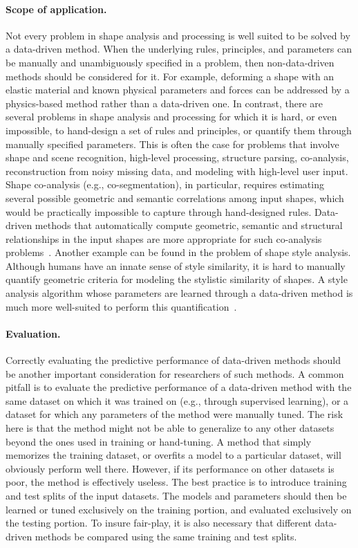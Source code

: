 \paragraph*{Scope of application.}
Not every problem in shape analysis and processing is well suited to be solved by a data-driven method. When the underlying rules, principles, and parameters can be manually and unambiguously specified in a problem, then non-data-driven  methods should be considered for it.
For example, deforming a shape with an elastic material and known physical parameters
and forces  can be addressed by a physics-based method rather than a data-driven one. In contrast, there are several problems in shape analysis and processing for
which it is hard, or even impossible, to hand-design a set of rules and principles, or quantify them through manually specified parameters. This is often the case for
problems that involve shape and scene recognition, high-level processing, structure parsing, co-analysis, reconstruction from noisy missing data, and modeling with high-level user input. Shape co-analysis (e.g., co-segmentation), in particular, requires
estimating several possible geometric and semantic correlations among input shapes, which would be practically impossible to capture through hand-designed rules. Data-driven methods that automatically compute geometric, semantic and structural relationships in the input shapes are
more appropriate for such co-analysis problems~\cite{Xu:2010:SCS,Huang:2011:JSS,Huang:2013:SDP}.
Another example can be found in the problem of shape style analysis. Although humans have an
innate sense of style similarity, it is hard to manually quantify geometric criteria
for modeling the stylistic similarity of shapes. A style analysis algorithm whose parameters are learned through a data-driven method is much more well-suited to perform this quantification~\cite{liu:style:2015,lun:style:2015}.



\paragraph*{Evaluation.}
Correctly evaluating the predictive performance of data-driven methods should be another important consideration for researchers of such methods. A common pitfall is to evaluate the predictive performance of a data-driven method
with the same dataset on which it was trained on (e.g., through supervised learning), or a dataset for
which any parameters of the method were manually tuned. The risk here is that the method
might not be able to generalize to any other datasets beyond the ones used in training
or hand-tuning. A method that simply memorizes
the training dataset, or overfits a model to a particular dataset, will obviously perform well there. However, if its performance on other datasets is poor, the method is effectively useless. The best practice is to introduce training and test splits of the input datasets. The models and parameters should then be learned or tuned exclusively on the training portion, and evaluated exclusively on the testing portion. To insure fair-play, it is also necessary that different data-driven methods be compared using the same training and test splits.%



